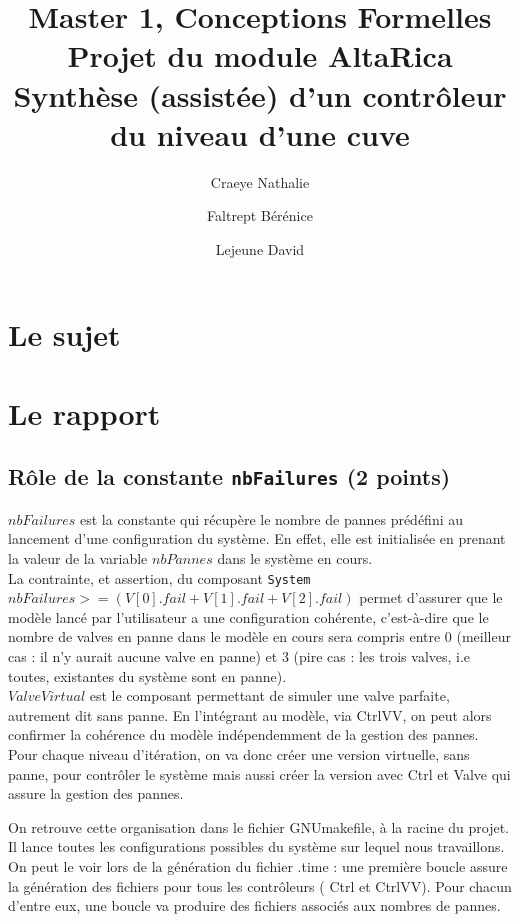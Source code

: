 \documentclass[a4paper]{book}
\newcommand{\altarica}{{\sc AltaRica}}
\begin{document}
\title{Master 1, Conceptions Formelles\\
Projet du module \altarica\\
Synthèse (assistée) d'un contrôleur du niveau d'une cuve}

\date{}

\author{Craeye Nathalie \and Faltrept Bérénice \and Lejeune David}

\maketitle

\chapter{Le sujet}


\chapter{Le rapport}
\section{Rôle de la constante {\tt nbFailures} (2 points)}

$nbFailures$ est la constante qui récupère le nombre de pannes prédéfini au lancement d'une configuration du système. En effet, elle est initialisée en prenant la valeur de la variable $nbPannes$ dans le système en cours. \\
La contrainte, et assertion, du composant {\tt System} $nbFailures >= (V[0].fail + V[1].fail + V[2].fail)$ permet d'assurer que le modèle lancé par l'utilisateur a une configuration cohérente, c'est-à-dire que le nombre de valves en panne dans le modèle en cours sera compris entre 0 (meilleur cas : il n'y aurait aucune valve en panne) et 3 (pire cas : les trois valves, i.e toutes, existantes du système sont en panne). \\

$ValveVirtual$ est le composant permettant de simuler une valve parfaite, autrement dit sans panne. En l'intégrant au modèle, via CtrlVV, on peut alors confirmer la cohérence du modèle indépendemment de la gestion des pannes. \\
Pour chaque niveau d'itération, on va donc créer une version virtuelle, sans panne, pour contrôler le système mais aussi créer la version avec Ctrl et Valve qui assure la gestion des pannes.

On retrouve cette organisation dans le fichier GNUmakefile, à la racine du projet. Il lance toutes les configurations possibles du système sur lequel nous travaillons. On peut le voir lors de la génération du fichier .time : une première boucle assure la génération des fichiers pour tous les contrôleurs ( Ctrl et CtrlVV). Pour chacun d'entre eux, une boucle va produire des fichiers associés aux nombres de pannes.
\end{document}
